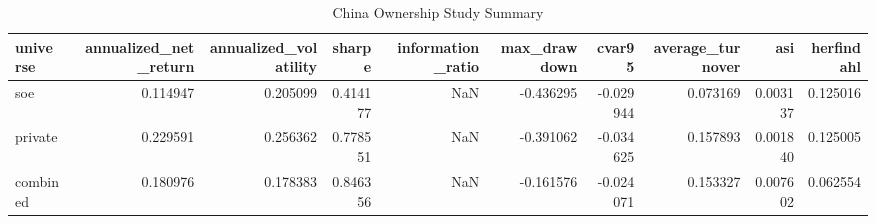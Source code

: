 \begin{table}
\caption{China Ownership Study Summary}
\label{tab:china_ownership}
\begin{tabular}{lrrrrrrrrr}
\toprule
universe & annualized_net_return & annualized_volatility & sharpe & information_ratio & max_drawdown & cvar95 & average_turnover & asi & herfindahl \\
\midrule
soe & 0.114947 & 0.205099 & 0.414177 & NaN & -0.436295 & -0.029944 & 0.073169 & 0.003137 & 0.125016 \\
private & 0.229591 & 0.256362 & 0.778551 & NaN & -0.391062 & -0.034625 & 0.157893 & 0.001840 & 0.125005 \\
combined & 0.180976 & 0.178383 & 0.846356 & NaN & -0.161576 & -0.024071 & 0.153327 & 0.007602 & 0.062554 \\
\bottomrule
\end{tabular}
\end{table}
